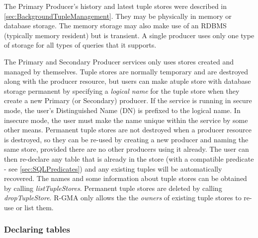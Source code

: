 The Primary Producer's history and latest tuple stores were described in 
\ref{sec:BackgroundTupleManagement}. They may be physically in memory or 
database storage. The memory storage may also make use of an RDBMS (typically 
memory resident) but is transient. A single producer uses 
only one type of storage for all types of queries that it supports.

The Primary and Secondary Producer services only uses stores created and 
managed by themselves. Tuple stores are normally temporary and are destroyed 
along with the producer resource, but users can make atuple store with database 
storage permanent by specifying a \textit{logical name} for the tuple store 
when they create a new Primary (or Secondary) producer. If the service is 
running in secure mode, the user's Distinguished Name (DN) is prefixed to the 
logical name. In insecure mode, the user must make the name unique within the 
service by some other means. Permanent tuple stores are not destroyed when a 
producer resource is destroyed, so they can be re-used by creating a new 
producer and naming the same store, provided there are no other producers using 
it already. The user can then re-declare any table that is already in the store 
(with a compatible predicate - see \ref{sec:SQLPredicates}) and any existing 
tuples will be automatically recovered. The names and some information about 
tuple stores can be obtained by calling \textit{listTupleStores}. Permanent tuple 
stores are deleted by calling \textit{dropTupleStore}. R-GMA only allows the 
the \textit{owners} of existing tuple stores to re-use or list them.

\subsubsection{Declaring tables}\label{sec:PrimaryProducerDeclaring}

